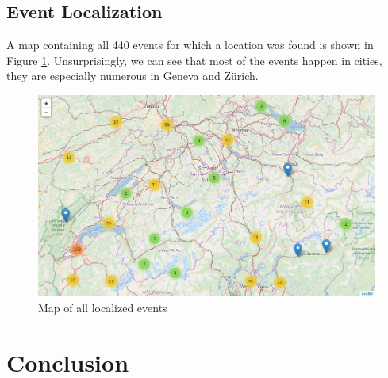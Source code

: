 \documentclass[11pt]{article}
\begin{document}
\subsection{Event Localization}
A map containing all 440 events for which a location was found is shown in Figure \ref{fig:events_map}. Unsurprisingly, we can see that most of the events happen in cities, they are especially numerous in Geneva and Z\"urich.

\begin{figure}[htbp]
  \vspace*{-1mm}
  \centering
  \includegraphics[width=\columnwidth]{figures/local_event_map.png}
  \vspace{-5mm}
  \caption{Map of all localized events}
  \label{fig:events_map}
\end{figure}

\section{Conclusion}
\end{document}
